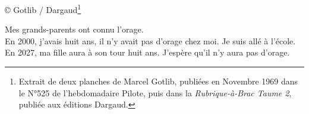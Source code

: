 \vspace*{-3.5mm}
© Gotlib / Dargaud\footnote{Extrait de deux planches de Marcel Gotlib, publiées en Novembre 1969 dans le N°525 de l'hebdomadaire Pilote, puis dans la \textit{Rubrique-à-Brac Taume 2}, publiée aux éditions Dargaud.}  %

\vspace*{-3mm}
\begin{flushright}
\noindent
Mes grands-parents ont connu l'orage.\\
En 2000, j'avais huit ans, il n'y avait pas d'orage chez moi. Je suis allé à l'école.\\
En 2027, ma fille aura à son tour huit ans. J'espère qu'il n'y aura pas d'orage.\\
\end{flushright}
\vspace*{-1cm}

